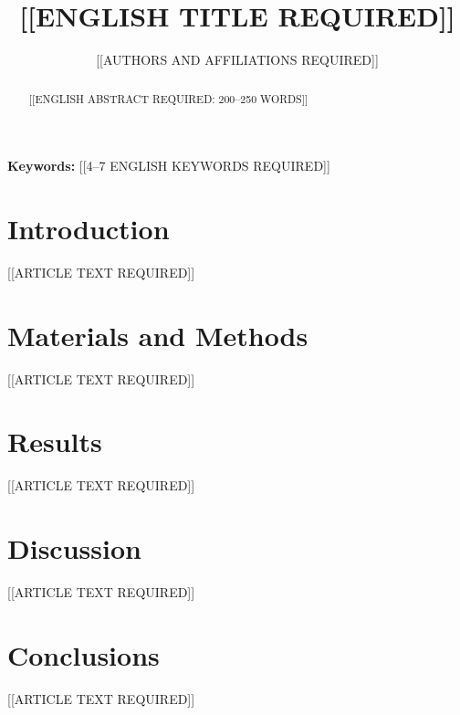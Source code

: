 \documentclass[12pt]{article}
\title{[[ENGLISH TITLE REQUIRED]]}
\author{[[AUTHORS AND AFFILIATIONS REQUIRED]]}
\date{}
\begin{document}
\linenumbers
\maketitle

\begin{abstract}
[[ENGLISH ABSTRACT REQUIRED: 200--250 WORDS]]
\end{abstract}

\textbf{Keywords:} [[4--7 ENGLISH KEYWORDS REQUIRED]]


\section{Introduction}
[[ARTICLE TEXT REQUIRED]]

\section{Materials and Methods}
[[ARTICLE TEXT REQUIRED]]

\section{Results}
[[ARTICLE TEXT REQUIRED]]


\section{Discussion}
[[ARTICLE TEXT REQUIRED]]

\section{Conclusions}
[[ARTICLE TEXT REQUIRED]]
\end{document}
